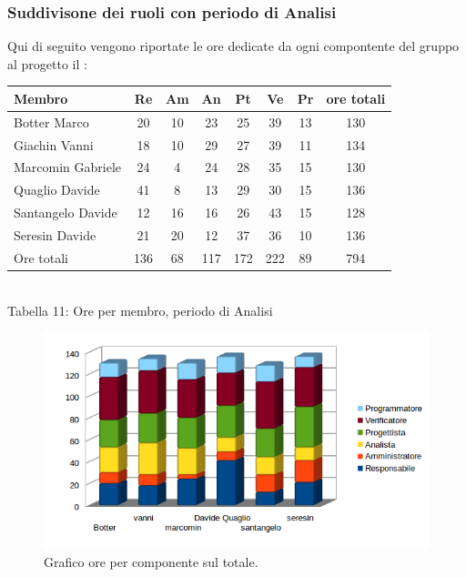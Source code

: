 \subsubsection{Suddivisone dei ruoli con periodo di Analisi}
Qui di seguito vengono riportate le ore dedicate da ogni compontente del gruppo \gruppo al progetto il \progetto:
\begin{center}
\begin{tabular}{| l | c | c | c | c | c | c | c |}
\hline
Membro & Re & Am & An & Pt & Ve & Pr & ore totali \\
\hline
Botter Marco & 20 & 10 & 23 & 25 & 39 & 13 & 130 \\

Giachin Vanni & 18 & 10 & 29 & 27 & 39 & 11 & 134 \\

Marcomin Gabriele & 24 & 4 & 24 & 28 & 35 & 15 & 130 \\

Quaglio Davide & 41 & 8 & 13 & 29 & 30 & 15 & 136 \\

Santangelo Davide & 12 & 16 & 16 & 26 & 43 & 15 & 128 \\

Seresin Davide & 21 & 20 & 12 & 37 & 36 & 10 & 136 \\
\hline
Ore totali & 136 & 68 & 117 & 172 & 222 & 89 & 794 \\
\hline
\end{tabular}
\\
Tabella 11: Ore per membro, periodo di Analisi
\end{center}
\begin{figure}[H] \centering \includegraphics[width=%
\textwidth]
{../modello/img/5.png} \caption{ Grafico ore per componente sul totale.}
\end{figure}
